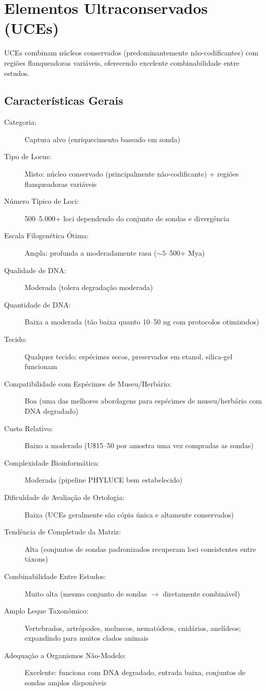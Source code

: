\textcite{dunn2008, misof2014, onetp2019, figuet2014}

\section{Elementos Ultraconservados (UCEs)}

UCEs combinam núcleos conservados (predominantemente não-codificantes) com regiões flanqueadoras variáveis, oferecendo excelente combinabilidade entre estudos.

\subsection{Características Gerais}

\begin{description}
\item[Categoria:] Captura alvo (enriquecimento baseado em sonda)
\item[Tipo de Locus:] Misto: núcleo conservado (principalmente não-codificante) + regiões flanqueadoras variáveis
\item[Número Típico de Loci:] 500--5.000+ loci dependendo do conjunto de sondas e divergência
\item[Escala Filogenética Ótima:] Ampla: profunda a moderadamente rasa (\(\sim 5\)--500+ Mya)
\item[Qualidade de DNA:] Moderada (tolera degradação moderada)
\item[Quantidade de DNA:] Baixa a moderada (tão baixa quanto 10--50 ng com protocolos otimizados)
\item[Tecido:] Qualquer tecido; espécimes secos, preservados em etanol, silica-gel funcionam
\item[Compatibilidade com Espécimes de Museu/Herbário:] Boa (uma das melhores abordagens para espécimes de museu/herbário com DNA degradado)
\item[Custo Relativo:] Baixo a moderado (U\$15--50 por amostra uma vez compradas as sondas)
\item[Complexidade Bioinformática:] Moderada (pipeline PHYLUCE bem estabelecido)
\item[Dificuldade de Avaliação de Ortologia:] Baixa (UCEs geralmente são cópia única e altamente conservados)
\item[Tendência de Completude da Matriz:] Alta (conjuntos de sondas padronizados recuperam loci consistentes entre táxons)
\item[Combinabilidade Entre Estudos:] Muito alta (mesmo conjunto de sondas $\rightarrow$ diretamente combinável)
\item[Amplo Leque Taxonômico:] Vertebrados, artrópodes, moluscos, nematódeos, cnidários, anelídeos; expandindo para muitos clados animais
\item[Adequação a Organismos Não-Modelo:] Excelente: funciona com DNA degradado, entrada baixa, conjuntos de sondas amplos disponíveis
\end{description}

